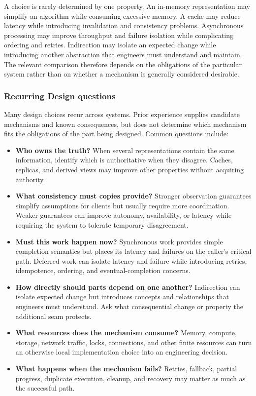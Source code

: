 A choice is rarely determined by one property.
An in-memory representation may simplify an algorithm while consuming excessive memory.
A cache may reduce latency while introducing invalidation and consistency problems.
Asynchronous processing may improve throughput and failure isolation while complicating ordering and retries.
Indirection may isolate an expected change while introducing another abstraction that engineers must understand and maintain.
The relevant comparison therefore depends on the obligations of the particular system rather than on whether a mechanism is generally considered desirable.

\subsubsection{Recurring Design questions}\label{recurring-design-questions}

Many design choices recur across systems.
Prior experience supplies candidate mechanisms and known consequences, but does not determine which mechanism fits the obligations of the part being designed.
Common questions include:

\begin{itemize}
\tightlist
\item
  \textbf{Who owns the truth?} When several representations contain the same information, identify which is authoritative when they disagree. Caches, replicas, and derived views may improve other properties without acquiring authority.
\item
  \textbf{What consistency must copies provide?} Stronger observation guarantees simplify assumptions for clients but usually require more coordination. Weaker guarantees can improve autonomy, availability, or latency while requiring the system to tolerate temporary disagreement.
\item
  \textbf{Must this work happen now?} Synchronous work provides simple completion semantics but places its latency and failures on the caller's critical path. Deferred work can isolate latency and failure while introducing retries, idempotence, ordering, and eventual-completion concerns.
\item
  \textbf{How directly should parts depend on one another?} Indirection can isolate expected change but introduces concepts and relationships that engineers must understand. Ask what consequential change or property the additional seam protects.
\item
  \textbf{What resources does the mechanism consume?} Memory, compute, storage, network traffic, locks, connections, and other finite resources can turn an otherwise local implementation choice into an engineering decision.
\item
  \textbf{What happens when the mechanism fails?} Retries, fallback, partial progress, duplicate execution, cleanup, and recovery may matter as much as the successful path.
\end{itemize}

